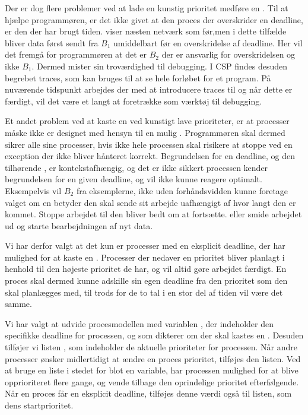 Der er dog flere problemer ved at lade en kunstig prioritet medføre en .  Til at hjælpe programmøren,  er det ikke givet at den proces der overskrider en deadline, er den der har brugt tiden.  viser næsten netværk som før,men i dette tilfælde bliver data først sendt fra $B_1$ umiddelbart før en overskridelse af deadline. Her vil det fremgå for programmøren  at det er $B_2$ der er ansvarlig for overskridelsen og ikke $B_1$. Dermed mister  sin troværdighed til debugging. I CSP findes desuden begrebet traces, som kan bruges til at se hele forløbet for et program. På nuværende tidspunkt arbejdes der med at introducere traces til \pycsp og når dette er færdigt, vil det være et langt at foretrække som værktøj til debugging.

Et andet problem ved at kaste en  ved kunstigt lave prioriteter, er at processer måske  ikke er designet med hensyn til en mulig . Programmøren skal dermed sikrer alle sine processer, hvis ikke hele processen skal risikere at stoppe ved en exception der ikke bliver hånteret korrekt. Begrundelsen for en deadline, og den tilhørende , er kontekstafhængig, og  det er ikke sikkert processen kender begrundelsen for en given deadline, og vil  ikke kunne reagere optimalt. Eksempelvis  vil $B_2$ fra eksemplerne, ikke uden  forhåndsvidden kunne foretage valget om en  betyder den skal sende sit arbejde uafhængigt af hvor langt den er kommet. Stoppe arbejdet til den bliver bedt om at fortsætte. eller smide arbejdet ud og starte bearbejdningen af nyt data.

Vi har derfor valgt at det kun er processer med en eksplicit deadline, der har mulighed for at kaste en . Processer der nedaver en prioritet bliver planlagt i henhold til den højeste prioritet de har, og vil altid  gøre arbejdet færdigt. En proces skal dermed kunne adskille sin egen deadline fra den prioritet som den skal planlægges med, til trods for de to tal i en stor del af tiden vil være det samme.

Vi har valgt at udvide procesmodellen med variablen , der indeholder den specifikke deadline for processen, og som dikterer om der skal kastes en 
. Desuden tilføjer vi listen , som indeholder de aktuelle prioriteter for processen. Når andre processer ønsker midlertidigt at ændre en proces prioritet, tilføjes den listen. Ved at bruge en liste i stedet for blot en variable, har processen mulighed for at blive opprioriteret flere gange, og vende tilbage den oprindelige prioritet efterfølgende. Når en proces får en eksplicit deadline, tilføjes denne værdi også til listen, som dens startprioritet. 

